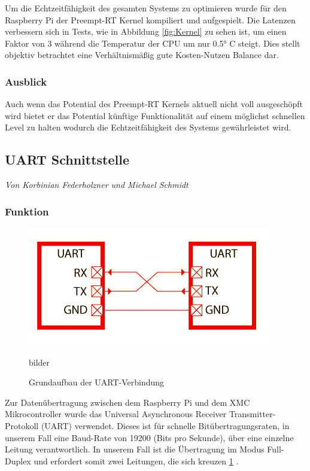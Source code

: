 \documentclass[12pt,a4paper,bibliography=totoc,listof=totoc]{scrartcl}
\begin{document}
Um die Echtzeitfähigkeit des gesamten Systems zu optimieren wurde für den Raspberry Pi der Preempt-RT Kernel kompiliert und aufgespielt.
Die Latenzen verbessern sich in Tests, wie in Abbildung \ref{fig:Kernel} zu sehen ist, 
um einen Faktor von 3 während die Temperatur der CPU um nur 0.5° C steigt. Dies stellt objektiv betrachtet eine
Verhältnismäßig gute Kosten-Nutzen Balance dar.
\subsubsection{Ausblick}
Auch wenn das Potential des Preempt-RT Kernels aktuell nicht voll ausgeschöpft wird bietet er das Potential künftige Funktionalität auf einem 
möglichst schnellen Level zu halten wodurch die Echtzeitfähigkeit des Systems gewährleistet wird.

\subsection{UART Schnittstelle}
\textit{Von Korbinian Federholzner und Michael Schmidt}\newline
\subsubsection{Funktion}
\begin{figure}[htbp]
	\centering
	\includegraphics[scale = 0.6]{pics/BildUart1}
	\caption{Grundaufbau der UART-Verbindung}bilder 
	\label{fig:UART}
\end{figure}
Zur Datenübertragung zwischen dem Raspberry Pi und dem XMC Mikrocontroller wurde das Universal 
Asynchronous Receiver Transmitter-Protokoll (UART) verwendet. Dieses ist für schnelle Bitübertragungsraten, 
in unserem Fall eine Baud-Rate von 19200 (Bits pro Sekunde), über eine einzelne Leitung verantwortlich. 
In unserem Fall ist die Übertragung im Modus Full-Duplex und erfordert somit zwei Leitungen, die sich 
kreuzen \ref{fig:UART} \cite {mikroe}.
\end{document}
